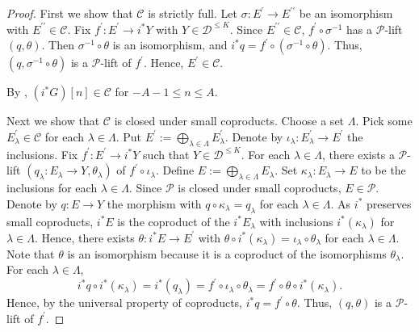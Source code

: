 \documentclass[11pt]{amsart}
\theoremstyle{plain}
\theoremstyle{definition}
\numberwithin{equation}{section}
\numberwithin{theorem}{section}
\begin{document}
\begin{proof}
    First we show that $\mathcal{C}$ is strictly full.
    Let $\sigma\colon E^\prime\to E^{\prime\prime}$ be an isomorphism with $E^{\prime\prime}\in \mathcal{C}$.
    Fix $f^\prime\colon E^\prime\to i^\ast Y$ with $Y\in \mathcal{D}^{\leq K}$.
    Since $E^{\prime\prime}\in \mathcal{C}$, $f^\prime\circ \sigma^{-1}$ has a $\mathcal{P}$-lift $(q,\theta)$.
    Then $\sigma^{-1}\circ \theta$ is an isomorphism, and $i^\ast q = f^\prime\circ (\sigma^{-1}\circ \theta)$.
    Thus, $(q,\sigma^{-1}\circ \theta)$ is a $\mathcal{P}$-lift of $f^\prime$. Hence, $E^\prime\in \mathcal{C}$.

    By , $(i^\ast G)[n] \in \mathcal{C}$  for $-A-1\leq n\leq A$.

    Next we show that $\mathcal{C}$ is closed under small coproducts.
    Choose a set $\Lambda$.
    Pick some $E^\prime_\lambda\in \mathcal{C}$ for each $\lambda\in \Lambda$.
    Put $E^\prime := \bigoplus_{\lambda\in \Lambda} E^\prime_\lambda$.
    Denote by $\iota_\lambda\colon E^\prime_\lambda\to E^\prime$ the inclusions.
    Fix $f^\prime\colon E^\prime\to i^\ast Y$ such that $Y\in \mathcal{D}^{\leq K}$.
    For each $\lambda \in \Lambda$, there exists a $\mathcal{P}$-lift $(q_\lambda\colon E_\lambda\to Y,\theta_\lambda)$ of $f^\prime\circ \iota_\lambda$.
    Define $E := \bigoplus_{\lambda\in \Lambda} E_\lambda$.
    Set $\kappa_\lambda\colon E_\lambda\to E$ to be the inclusions for each $\lambda \in \Lambda$.
    Since $\mathcal{P}$ is closed under small coproducts, $E\in \mathcal{P}$.
    Denote by $q\colon E\to Y$ the morphism with $q\circ \kappa_\lambda = q_\lambda$ for each $\lambda \in \Lambda$.
    As $i^\ast$ preserves small coproducts, $i^\ast E$ is the coproduct of the $i^\ast E_\lambda$ with inclusions $i^\ast(\kappa_\lambda)$ for $\lambda \in \Lambda$.
    Hence, there exists $\theta\colon i^\ast E\to E^\prime$ with $\theta\circ i^\ast(\kappa_\lambda) = \iota_\lambda\circ \theta_\lambda$ for each $\lambda \in \Lambda$.
    Note that $\theta$ is an isomorphism because it is a coproduct of the isomorphisms $\theta_\lambda$.
    For each $\lambda \in \Lambda$,
    \begin{displaymath}
        i^\ast q\circ i^\ast(\kappa_\lambda)
        = i^\ast(q_\lambda)
        = f^\prime\circ \iota_\lambda\circ \theta_\lambda
        = f^\prime\circ \theta\circ i^\ast(\kappa_\lambda).
    \end{displaymath}
    Hence, by the universal property of coproducts, $i^\ast q = f^\prime\circ \theta$.
    Thus, $(q,\theta)$ is a $\mathcal{P}$-lift of $f^\prime$.


\end{proof}
\end{document}

